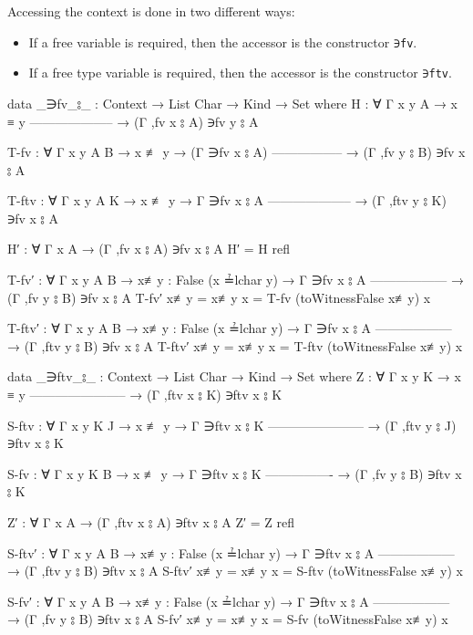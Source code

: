\documentclass[logo,bsc,singlespacing,parskip,online]{infthesis}
\renewenvironment{code}{\mintedcopy[breaklines,breaksymbolleft=\;]{agda}}{\endmintedcopy}
\begin{document}
Accessing the context is done in two different ways:
\begin{itemize}
  \item If a free variable is required, then the accessor is the constructor \texttt{∋fv}.
  \item If a free type variable is required, then the accessor is the constructor \texttt{∋ftv}.
\end{itemize}
\begin{code}
  data _∋fv_⦂_ : Context → List Char → Kind → Set where
    H : ∀ {Γ x y A}
      → x ≡ y
        --------------------
      → (Γ ,fv x ⦂ A) ∋fv y ⦂ A

    T-fv : ∀ {Γ x y A B}
      → x ≢ y
      → (Γ ∋fv x ⦂ A)
        -----------------
      → (Γ ,fv y ⦂ B) ∋fv x ⦂ A

    T-ftv : ∀ {Γ x y A K}
      → x ≢ y
      → Γ ∋fv x ⦂ A
        --------------------
      → (Γ ,ftv y ⦂ K) ∋fv x ⦂ A

  H′ : ∀ {Γ x A} → (Γ ,fv x ⦂ A) ∋fv x ⦂ A
  H′ = H refl

  T-fv′ : ∀ {Γ x y A B}
    → {x≢y : False (x ≟lchar y)}
    → Γ ∋fv x ⦂ A
      ------------------
    → (Γ ,fv y ⦂ B) ∋fv x ⦂ A
  T-fv′ { x≢y = x≢y } x = T-fv (toWitnessFalse x≢y) x

  T-ftv′ : ∀ {Γ x y A B}
    → {x≢y : False (x ≟lchar y)}
    → Γ ∋fv x ⦂ A
      ------------------
    → (Γ ,ftv y ⦂ B) ∋fv x ⦂ A
  T-ftv′ { x≢y = x≢y } x = T-ftv (toWitnessFalse x≢y) x

  data _∋ftv_⦂_ : Context → List Char → Kind → Set where
    Z : ∀ {Γ x y K}
      → x ≡ y
        -----------------------
      → (Γ ,ftv x ⦂ K) ∋ftv x ⦂ K

    S-ftv : ∀ {Γ x y K J}
      → x ≢ y
      → Γ ∋ftv x ⦂ K
        -----------------------
      → (Γ ,ftv y ⦂ J) ∋ftv x ⦂ K

    S-fv : ∀ {Γ x y K B}
      → x ≢ y
      → Γ ∋ftv x ⦂ K
        ----------------
      → (Γ ,fv y ⦂ B) ∋ftv x ⦂ K

  Z′ : ∀ {Γ x A} → (Γ ,ftv x ⦂ A) ∋ftv x ⦂ A
  Z′ = Z refl

  S-ftv′ : ∀ {Γ x y A B}
    → {x≢y : False (x ≟lchar y)}
    → Γ ∋ftv x ⦂ A
      ------------------
    → (Γ ,ftv y ⦂ B) ∋ftv x ⦂ A
  S-ftv′ { x≢y = x≢y } x = S-ftv (toWitnessFalse x≢y) x

  S-fv′ : ∀ {Γ x y A B}
    → {x≢y : False (x ≟lchar y)}
    → Γ ∋ftv x ⦂ A
      ------------------
    → (Γ ,fv y ⦂ B) ∋ftv x ⦂ A
  S-fv′ { x≢y = x≢y } x = S-fv (toWitnessFalse x≢y) x
\end{code}
\end{document}
